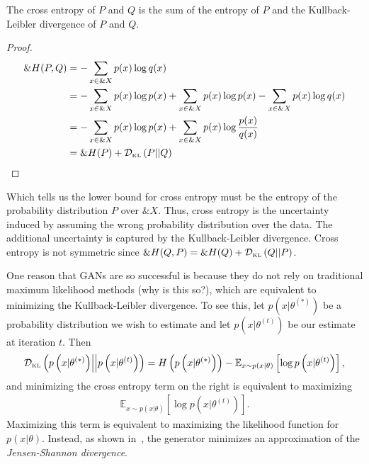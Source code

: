 \begin{lemma}
The cross entropy of $P$ and $Q$ is the sum of the entropy of $P$ and the
Kullback-Leibler divergence of $P$ and $Q$.
\end{lemma}
\begin{proof}
\begin{align}
  \label{eq:cross-entropy-alt}
  \&H(P, Q) & = -\sum_{x \in \&X} p(x) \log q(x) \\
            & = -\sum_{x \in \&X} p(x) \log p(x) + \sum_{x \in \&X} p(x) \log p(x) - \sum_{x \in \&X} p(x) \log q(x) \\
            & = -\sum_{x \in \&X} p(x) \log p(x) + \sum_{x \in \&X} p(x) \log {p(x) \over q(x)} \\
            & = \&H(P) + \mathcal{D}_{\text{\tiny KL}}\left( P \middle| \middle| Q \right)
\end{align}
\end{proof}

Which tells us the lower bound for cross entropy must be the entropy of the
probability distribution $P$ over $\&X$. Thus, cross entropy is the uncertainty
induced by assuming the wrong probability distribution over the data. The
additional uncertainty is captured by the Kullback-Leibler divergence. Cross
entropy is not symmetric since $\&H(Q, P) = \&H(Q) + \mathcal{D}_{\text{\tiny KL}}\left( Q \middle| \middle| P \right)$.

One reason that GANs are so successful is because they do not rely on
traditional maximum likelihood methods (why is this so?), which are equivalent
to minimizing the Kullback-Leibler divergence. To see this, let $p\left(x |
  \theta^{(*)}\right)$ be a probability distribution we wish to estimate and let
$p\left(x | \theta^{\left(t\right)}\right)$ be our estimate at iteration $t$.
Then
\begin{align}
  \label{eq:equivalent-mle}
  \mathcal{D}_{\text{\tiny KL}}\left( p\left(x | \theta^{(*)}\right) \middle| \middle| p\left(x | \theta^{\left(t\right)}\right) \right) =
  H\left(p\left(x | \theta^{(*)}\right)\right) -
  \mathbb{E}_{x \sim p\left(x | \theta\right)}\left[ \log p\left(x | \theta^{\left(t\right)}\right) \right],
 \end{align}
 and minimizing the cross entropy term on the right is equivalent to maximizing
 \begin{align}
   \mathbb{E}_{x \sim p\left(x | \theta\right)}\left[ \log p\left(x | \theta^{\left(t\right)}\right) \right].
 \end{align}
 Maximizing this term is equivalent to maximizing the likelihood
 function for $p\left(x | \theta\right)$. Instead, as shown
 in~\cite{ref:goodfellow-original}, the generator minimizes an
 approximation of the \textit{Jensen-Shannon divergence}.

